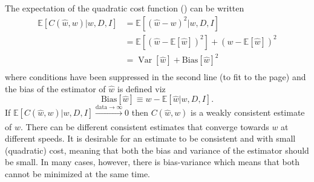 \begin{theorem}
	\label{theorem:MSE}
	The expectation of the quadratic cost function () can be written
	\begin{equation}
		\begin{split}
			\mathbb{E}[C(\hat{w}, w)|w,D,I] &= \mathbb{E}[(\hat{w}-w)^2|w,D,I]\\ 
			&= \mathbb{E}[(\hat{w}-\mathbb{E}[\hat{w}])^2]+(w-\mathbb{E}[\hat{w}])^2\\
			&=\operatorname{Var}[\hat{w}]+\text{Bias}[\hat{w}]^2\\
		\end{split}
		\label{eq:MSE}
	\end{equation}
	where conditions have been suppressed in the second line (to fit to the page) and the bias of the estimator of $\hat{w}$ is defined viz
	\begin{equation}
		\text{Bias}[\hat{w}]\equiv w-\mathbb{E}[\hat{w}|w,D,I].
	\end{equation}
	If $\mathbb{E}[C(\hat{w}, w)|w,D,I]\xrightarrow[]{\text{data}\rightarrow\infty} 0$ then $C(\hat{w}, w)$ is a weakly consistent estimate of $w$. There can be different consistent estimates that converge towards $w$ at different speeds. It is desirable for an estimate to be consistent and with small (quadratic) cost, meaning that both the bias and variance of the estimator should be small. In many cases, however, there is bias-variance which means that both cannot be minimized at the same time. 
\end{theorem}

